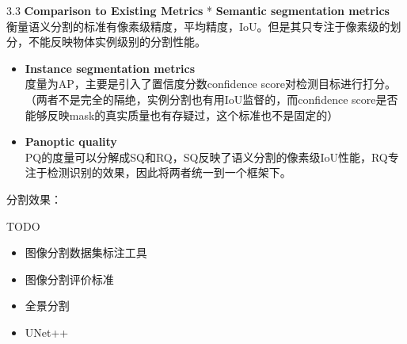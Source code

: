 3.3 \textbf{Comparison to Existing Metrics} * \textbf{Semantic
segmentation metrics}\\
衡量语义分割的标准有像素级精度，平均精度，IoU。但是其只专注于像素级的划分，不能反映物体实例级别的分割性能。

\begin{itemize}
\item
  \textbf{Instance segmentation metrics}\\
  度量为AP，主要是引入了置信度分数confidence
  score对检测目标进行打分。（两者不是完全的隔绝，实例分割也有用IoU监督的，而confidence
  score是否能够反映mask的真实质量也有存疑过，这个标准也不是固定的）
\item
  \textbf{Panoptic quality}\\
  PQ的度量可以分解成SQ和RQ，SQ反映了语义分割的像素级IoU性能，RQ专注于检测识别的效果，因此将两者统一到一个框架下。
\end{itemize}

分割效果： %

TODO

\begin{itemize}
\item
  图像分割数据集标注工具
\item
  图像分割评价标准
\item
  全景分割
\item
  UNet++
\end{itemize}
